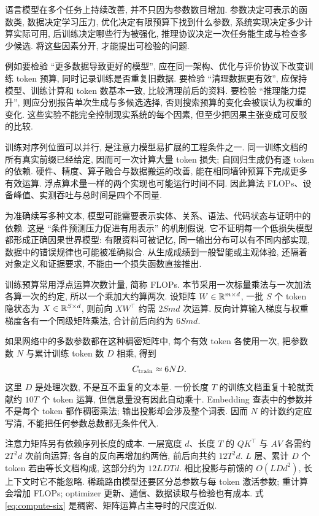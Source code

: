 \label{ch:progress}
\label{sec:progress-factors}
语言模型在多个任务上持续改善, 并不只因为参数数目增加. 参数决定可表示的函数类, 数据决定学习压力, 优化决定有限预算下找到什么参数, 系统实现决定多少计算实际可用, 后训练决定哪些行为被强化, 推理协议决定一次任务能生成与检查多少候选. 将这些因素分开, 才能提出可检验的问题.

例如要检验 ``更多数据导致更好的模型'', 应在同一架构、优化与评价协议下改变训练 token 预算, 同时记录训练是否重复旧数据. 要检验 ``清理数据更有效'', 应保持模型、训练计算和 token 数基本一致, 比较清理前后的资料. 要检验 ``推理能力提升'', 则应分别报告单次生成与多候选选择, 否则搜索预算的变化会被误认为权重的变化. 这些实验不能完全控制现实系统的每个因素, 但至少把因果主张变成可反驳的比较.

训练对序列位置可以并行, 是注意力模型易扩展的工程条件之一. 同一训练文档的所有真实前缀已经给定, 因而可一次计算大量 token 损失; 自回归生成仍有逐 token 的依赖. 硬件、精度、算子融合与数据搬运的改善, 能在相同墙钟预算下完成更多有效运算. 浮点算术量一样的两个实现也可能运行时间不同. 因此算法 FLOPs、设备峰值、实测吞吐与总时间是四个不同量.

为准确续写多种文本, 模型可能需要表示实体、关系、语法、代码状态与证明中的依赖. 这是 ``条件预测压力促进有用表示'' 的机制假说. 它不证明每一个低损失模型都形成正确因果世界模型: 有限资料可被记忆, 同一输出分布可以有不同内部实现, 数据中的错误规律也可能被准确拟合. 从生成成绩到一般智能或主观体验, 还隔着对象定义和证据要求, 不能由一个损失函数直接推出.

\label{sec:progress-flops}
训练预算常用浮点运算次数计量, 简称 FLOPs. 本节采用一次标量乘法与一次加法各算一次的约定, 所以一个乘加大约算两次. 设矩阵 $W\in\mathbb R^{m\times d}$, 一批 $S$ 个 token 隐状态为 $X\in\mathbb R^{S\times d}$, 则前向 $XW^\top$ 约需 $2Smd$ 次运算. 反向计算输入梯度与权重梯度各有一个同级矩阵乘法, 合计前后向约为 $6Smd$.

如果网络中的多数参数都在这种稠密矩阵中, 每个有效 token 各使用一次, 把参数数 $N$ 与累计训练 token 数 $D$ 相乘, 得到
\begin{equation}\label{eq:compute-six}
C_{\rm train}\approx6ND.
\end{equation}
这里 $D$ 是处理次数, 不是互不重复的文本量. 一份长度 $T$ 的训练文档重复十轮就贡献约 $10T$ 个 token 运算, 但信息量没有因此自动乘十. Embedding 查表中的参数并不是每个 token 都作稠密乘法; 输出投影却会涉及整个词表. 因而 $N$ 的计数约定应写清, 不能把任何参数总数都无条件代入.

注意力矩阵另有依赖序列长度的成本. 一层宽度 $d$、长度 $T$ 的 $QK^\top$ 与 $AV$ 各需约 $2T^2d$ 次前向运算; 各自的反向再增加约两倍, 前后向共约 $12T^2d$. $L$ 层、累计 $D$ 个 token 若由等长文档构成, 这部分约为 $12LDTd$. 相比投影与前馈的 $O(LDd^2)$, 长上下文时它不能忽略. 稀疏路由模型还要区分总参数与每 token 激活参数; 重计算会增加 FLOPs; optimizer 更新、通信、数据读取与检验也有成本. 式 \eqref{eq:compute-six} 是稠密、矩阵运算占主导时的尺度近似.

